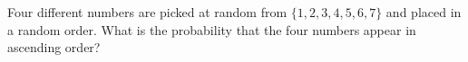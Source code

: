 Four different numbers are picked at random from $\{1,2,3,4,5,6,7\}$ and placed in a random order. What is the probability that the four numbers appear in ascending order?
